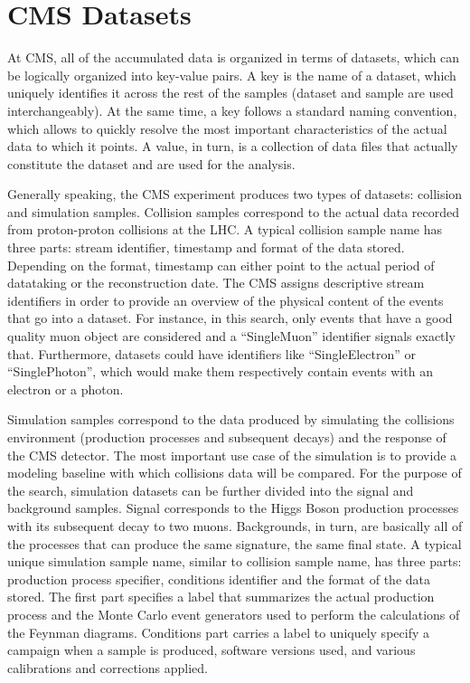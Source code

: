\section{CMS Datasets} \label{section:higgs_data}
At CMS, all of the accumulated data is organized in terms of datasets, which can be logically organized into key-value pairs. A key is the name of a dataset, which uniquely identifies it across the rest of the samples (dataset and sample are used interchangeably). At the same time, a key follows a standard naming convention, which allows to quickly resolve the most important characteristics of the actual data to which it points. A value, in turn, is a collection of data files that actually constitute the dataset and are used for the analysis.

Generally speaking, the CMS experiment produces two types of datasets: collision and simulation samples. Collision samples correspond to the actual data recorded from proton-proton collisions at the LHC. A typical collision sample name has three parts: stream identifier, timestamp and format of the data stored. Depending on the format, timestamp can either point to the actual period of datataking or the reconstruction date. The CMS assigns descriptive stream identifiers in order to provide an overview of the physical content of the events that go into a dataset. For instance, in this search, only events that have a good quality muon object are considered and a ``SingleMuon'' identifier signals exactly that. Furthermore, datasets could have identifiers like ``SingleElectron'' or ``SinglePhoton'', which would make them respectively contain events with an electron or a photon.

Simulation samples correspond to the data produced by simulating the collisions environment (production processes and subsequent decays) and the response of the CMS detector. The most important use case of the simulation is to provide a modeling baseline with which collisions data will be compared. For the purpose of the search, simulation datasets can be further divided into the signal and background samples. Signal corresponds to the Higgs Boson production processes with its subsequent decay to two muons. Backgrounds, in turn, are basically all of the processes that can produce the same signature, the same final state. A typical unique simulation sample name, similar to collision sample name, has three parts: production process specifier, conditions identifier and the format of the data stored. The first part specifies a label that summarizes the actual production process and the Monte Carlo event generators used to perform the calculations of the Feynman diagrams. Conditions part carries a label to uniquely specify a campaign when a sample is produced, software versions used, and various calibrations and corrections applied.

